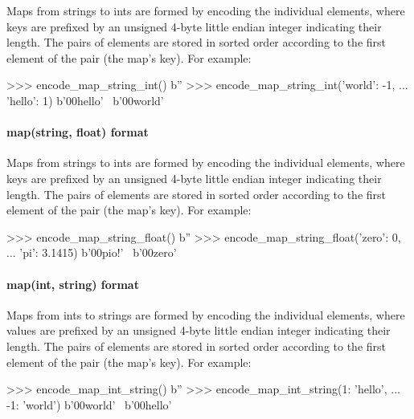 Maps from strings to ints are formed by encoding the individual elements, where
keys are prefixed by an unsigned 4-byte little endian integer indicating their
length.  The pairs of elements are stored in sorted order according to the first
element of the pair (the map's key).  For example:

\begin{pythoncode}
>>> encode_map_string_int({})
b''
>>> encode_map_string_int({'world': -1,
...                        'hello': 1})
b'\x00hello' \
b'\x00world\xff\xff\xff\xff\xff\xff\xff\xff'
\end{pythoncode}

\paragraph{map(string, float) format}

Maps from strings to ints are formed by encoding the individual elements, where
keys are prefixed by an unsigned 4-byte little endian integer indicating their
length.  The pairs of elements are stored in sorted order according to the first
element of the pair (the map's key).  For example:

\begin{pythoncode}
>>> encode_map_string_float({})
b''
>>> encode_map_string_float({'zero': 0,
...                          'pi': 3.1415})
b'\x00\x00pio\xca!\t@' \
b'\x00zero'
\end{pythoncode}

\paragraph{map(int, string) format}

Maps from ints to strings are formed by encoding the individual elements, where
values are prefixed by an unsigned 4-byte little endian integer indicating their
length.  The pairs of elements are stored in sorted order according to the first
element of the pair (the map's key).  For example:

\begin{pythoncode}
>>> encode_map_int_string({})
b''
>>> encode_map_int_string({1: 'hello',
...                        -1: 'world'})
b'\xff\xff\xff\xff\xff\xff\xff\xff\x05\x00world' \
b'\x00hello'
\end{pythoncode}

